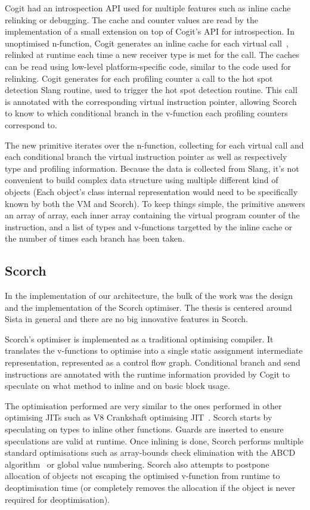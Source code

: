 \documentclass[a4paper,12pt,twoside]{../includes/ThesisStyle}
\begin{document}
Cogit had an introspection API used for multiple features such as inline cache relinking or debugging. The cache and counter values are read by the implementation of a small extension on top of Cogit's API for introspection. In unoptimised n-function, Cogit generates an inline cache for each virtual call~\cite{Deut84a,Holz91a}, relinked at runtime each time a new receiver type is met for the call. The caches can be read using low-level platform-specific code, similar to the code used for relinking. Cogit generates for each profiling counter a call to the hot spot detection Slang routine, used to trigger the hot spot detection routine. This call is annotated with the corresponding virtual instruction pointer, allowing Scorch to know to which conditional branch in the v-function each profiling counters correspond to.

The new primitive iterates over the n-function, collecting for each virtual call and each conditional branch the virtual instruction pointer as well as respectively type and profiling information. Because the data is collected from Slang, it's not convenient to build complex data structure using multiple different kind of objects (Each object's class internal representation would need to be specifically known by both the VM and Scorch). To keep things simple, the primitive answers an array of array, each inner array containing the virtual program counter of the instruction, and a list of types and v-functions targetted by the inline cache or the number of times each branch has been taken.

\subsection{Scorch}

In the implementation of our architecture, the bulk of the work was the design and the implementation of the Scorch optimiser. The thesis is centered around Sista in general and there are no big innovative features in Scorch.

Scorch's optimiser is implemented as a traditional optimising compiler. It translates the v-functions to optimise into a single static assignment intermediate representation, represented as a control flow graph. Conditional branch and send instructions are annotated with the runtime information provided by Cogit to speculate on what method to inline and on basic block usage.

The optimisation performed are very similar to the ones performed in other optimising JITs such as V8 Crankshaft optimising JIT~\cite{V8}. Scorch starts by speculating on types to inline other functions. Guards are inserted to ensure speculations are valid at runtime. Once inlining is done, Scorch performs multiple standard optimisations such as array-bounds check elimination with the ABCD algorithm~\cite{Bodi00a} or global value numbering. Scorch also attempts to postpone allocation of objects not escaping the optimised v-function from runtime to deoptimisation time (or completely removes the allocation if the object is never required for deoptimisation).
\end{document}
